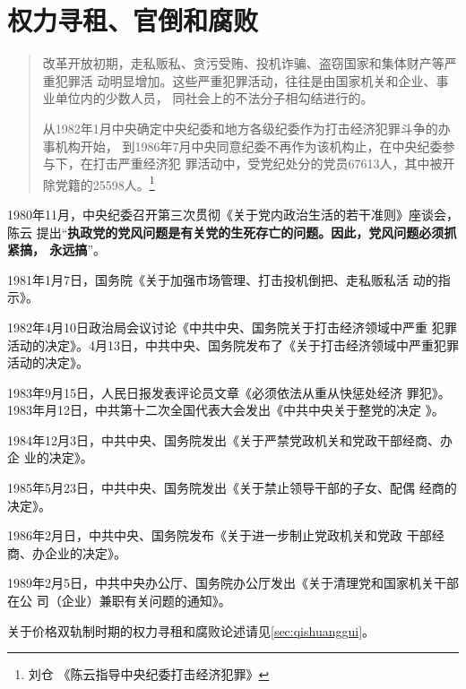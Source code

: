 \section{权力寻租、官倒和腐败}


\begin{quotation}
  改革开放初期，走私贩私、贪污受贿、投机诈骗、盗窃国家和集体财产等严重犯罪活
  动明显增加。这些严重犯罪活动，往往是由国家机关和企业、事业单位内的少数人员，
  同社会上的不法分子相勾结进行的。

  从1982年1月中央确定中央纪委和地方各级纪委作为打击经济犯罪斗争的办事机构开始，
  到1986年7月中央同意纪委不再作为该机构止，在中央纪委参与下，在打击严重经济犯
  罪活动中，受党纪处分的党员67613人，其中被开除党籍的25598人。\footnote{刘仓 《陈云指导中央纪委打击经济犯罪》}
\end{quotation}

1980年11月，中央纪委召开第三次贯彻《关于党内政治生活的若干准则》座谈会，陈云
提出“\textbf{执政党的党风问题是有关党的生死存亡的问题。因此，党风问题必须抓紧搞，
  永远搞}”。

1981年1月7日，国务院《关于加强市场管理、打击投机倒把、走私贩私活
动的指示》。

1982年4月10日政治局会议讨论《中共中央、国务院关于打击经济领域中严重
犯罪活动的决定》。4月13日，中共中央、国务院发布了《关于打击经济领域中严重犯罪
活动的决定》。

1983年9月15日，人民日报发表评论员文章《必须依法从重从快惩处经济
罪犯》。1983年月12日，中共第十二次全国代表大会发出《中共中央关于整党的决定
》。

1984年12月3日，中共中央、国务院发出《关于严禁党政机关和党政干部经商、办企
业的决定》。

1985年5月23日，中共中央、国务院发出《关于禁止领导干部的子女、配偶
经商的决定》。

1986年2月日，中共中央、国务院发布《关于进一步制止党政机关和党政
干部经商、办企业的决定》。

1989年2月5日，中共中央办公厅、国务院办公厅发出《关于清理党和国家机关干部在公
司（企业）兼职有关问题的通知》。

关于价格双轨制时期的权力寻租和腐败论述请见\cref{sec:qishuanggui}。


